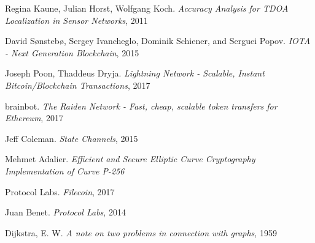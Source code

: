 \documentclass[10pt, nonatbib, nocopyrightspace, reprint]{sigplanconf}
\begin{document}
\begin{thebibliography}{10}
    Regina Kaune, Julian Horst, Wolfgang Koch. 
    \emph{Accuracy Analysis for TDOA Localization in Sensor Networks}, 2011

    David Sønstebø, Sergey Ivancheglo, Dominik Schiener, and Serguei Popov. 
    \emph{IOTA - Next Generation Blockchain}, 2015

    Joseph Poon, Thaddeus Dryja. 
    \emph{Lightning Network - Scalable, Instant Bitcoin/Blockchain Transactions}, 2017

    brainbot. 
    \emph{The Raiden Network - Fast, cheap, scalable token transfers for Ethereum}, 2017

    Jeff Coleman. 
    \emph{State Channels}, 2015

    Mehmet Adalier. 
    \emph{Efficient and Secure Elliptic Curve Cryptography Implementation of Curve P-256}

    Protocol Labs. 
    \emph{Filecoin}, 2017

    Juan Benet. 
    \emph{Protocol Labs}, 2014

    Dijkstra, E. W. 
    \emph{A note on two problems in connection with graphs}, 1959

\end{thebibliography}
\end{document}
